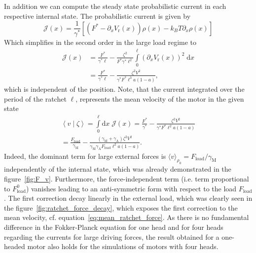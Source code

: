 \documentclass[aps,pre,twocolumn,showpacs,showkeys,superscriptaddress,floatfix]{revtex4-1}
\newcommand{\rmd}{{\mathrm d}}
\begin{document}
In addition we can compute the steady state probabilistic current in each respective internal state.
The probabilistic current is given by 
\[
\mathcal{J}(x) = \frac{1}{\gamma^*} \left[ \left( F^* - \partial_x V_\text{r}(x) \right) \rho(x) - k_B T \partial_x \rho(x) \right] 
\]
Which simplifies in the second order in the large load regime to
\begin{align*}
\mathcal{J}(x) 
&= \frac{F^*}{\gamma^* \ell} - \frac{\zeta^2}{F^* \gamma^* \ell^2} \int\limits^\ell_0 \left( \partial_x V_\text{r}(x) \right)^2 \; \rmd x \\
&= \frac{F^*}{\gamma^* \ell} - \frac{\zeta^2 V^2}{\gamma^* F^* \ell^3 a (1-a) } ,
\end{align*}
which is independent of the position. 
Note, that the current integrated over the period of the ratchet $\ell$, represents the mean velocity of the motor in the given state
\begin{multline}
\left\langle v \middle| \zeta \right\rangle 
= \int\limits_0^\ell \rmd x \; {\mathcal J}(x) 
= \frac{F^*}{\gamma^*} - \frac{\zeta^2 V^2}{\gamma^* F^* \ell^2 a (1-a) } 
\\
= \frac{F_\text{load}}{\gamma_\text{M}} - \frac{ ( \gamma_\text{M} + \gamma_\text{A} ) \zeta^2 V^2}{\gamma_\text{M} \gamma_\text{A} F_\text{load} \ell^2 a (1-a) } .
\label{eq:mean_velocity_large}
\end{multline}
Indeed, the dominant term for large external forces is $\langle v \rangle_{\rho_0} = F_\text{load} / \gamma_\text{M}$ independently of the internal state, 
which was already demonstrated in the figure~\ref{fig:F_v}. 
Furthermore, the force-independent term (i.e. term proportional to $F_\text{load}^0$) vanishes leading to an anti-symmetric form with respect to the load $F_\text{load}$. 
The first correction decay linearly in the external load, which was clearly seen in the figure~\ref{fig:ratchet_force_decay}, 
which exposes the first correction to the mean velocity, cf. equation~\eqref{eq:mean_ratchet_force}. 
As there is no fundamental difference in the Fokker-Planck equation for one head and for four heads regarding the currents for large driving forces, 
the result obtained for a one-headed motor also holds for the simulations of motors with four heads. 


\end{document}
